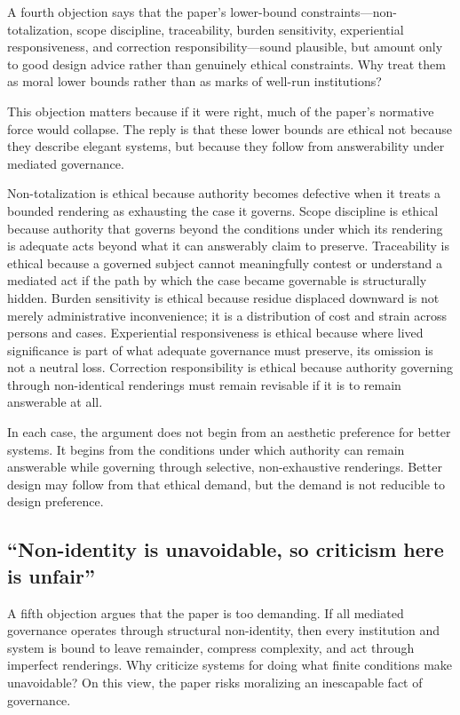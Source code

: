 \documentclass[11pt]{article}
\begin{document}
A fourth objection says that the paper's lower-bound constraints---non-totalization, scope discipline, traceability, burden sensitivity, experiential responsiveness, and correction responsibility---sound plausible, but amount only to good design advice rather than genuinely ethical constraints. Why treat them as moral lower bounds rather than as marks of well-run institutions?

This objection matters because if it were right, much of the paper's normative force would collapse. The reply is that these lower bounds are ethical not because they describe elegant systems, but because they follow from answerability under mediated governance.

Non-totalization is ethical because authority becomes defective when it treats a bounded rendering as exhausting the case it governs. Scope discipline is ethical because authority that governs beyond the conditions under which its rendering is adequate acts beyond what it can answerably claim to preserve. Traceability is ethical because a governed subject cannot meaningfully contest or understand a mediated act if the path by which the case became governable is structurally hidden. Burden sensitivity is ethical because residue displaced downward is not merely administrative inconvenience; it is a distribution of cost and strain across persons and cases. Experiential responsiveness is ethical because where lived significance is part of what adequate governance must preserve, its omission is not a neutral loss. Correction responsibility is ethical because authority governing through non-identical renderings must remain revisable if it is to remain answerable at all.

In each case, the argument does not begin from an aesthetic preference for better systems. It begins from the conditions under which authority can remain answerable while governing through selective, non-exhaustive renderings. Better design may follow from that ethical demand, but the demand is not reducible to design preference.

\subsection{``Non-identity is unavoidable, so criticism here is unfair''}

A fifth objection argues that the paper is too demanding. If all mediated governance operates through structural non-identity, then every institution and system is bound to leave remainder, compress complexity, and act through imperfect renderings. Why criticize systems for doing what finite conditions make unavoidable? On this view, the paper risks moralizing an inescapable fact of governance.
\end{document}
